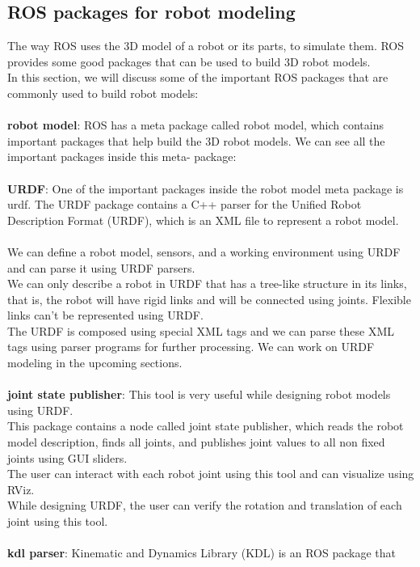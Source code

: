 	\subsection{ROS packages for robot modeling}
	The way ROS uses the 3D model of a robot or its parts, to simulate them. ROS provides some good packages that can be used to build 3D robot models.\\ In this
	section, we will discuss some of the important ROS packages that are commonly used to
	build robot models:
	\\\\\textbf{robot model}: ROS has a meta package called robot model, which contains important 
	packages that 
	help build the 3D robot models. We can see all the important packages inside this meta-
	package:
	\\\\\textbf{URDF}: One of the important packages inside the robot model meta package is urdf. The 
	URDF package contains a C++ parser for the Unified Robot Description Format (URDF),
	which is an XML file to represent a robot model.
	\\\\ We can define a robot model, sensors, and a working environment using URDF and 
	can parse it using URDF parsers.
	\\We can only describe a robot in URDF that has a tree-like 
	structure in its links, that is, the robot will have rigid links and will be connected 
	using joints. Flexible links can't be represented using URDF.
	\\ The URDF is composed using special XML tags and we can parse these XML tags using 
	parser programs for further processing. We can work on URDF modeling in the upcoming 
	sections.
	\\\\\textbf{joint state publisher}: This tool is very useful while designing robot 
	models using URDF.
	\\This package contains a node called joint state publisher, which reads the robot 
	model description, finds all joints, and publishes joint values to all non fixed 
	joints 
	using GUI sliders. 
	\\The user can interact with each robot joint using this tool and can visualize using 
	RViz.
	\\While designing URDF, the user can verify the rotation and translation of each 
	joint using this tool. 
	\\\\\textbf{kdl parser}: Kinematic and Dynamics Library (KDL) is an ROS package that 

